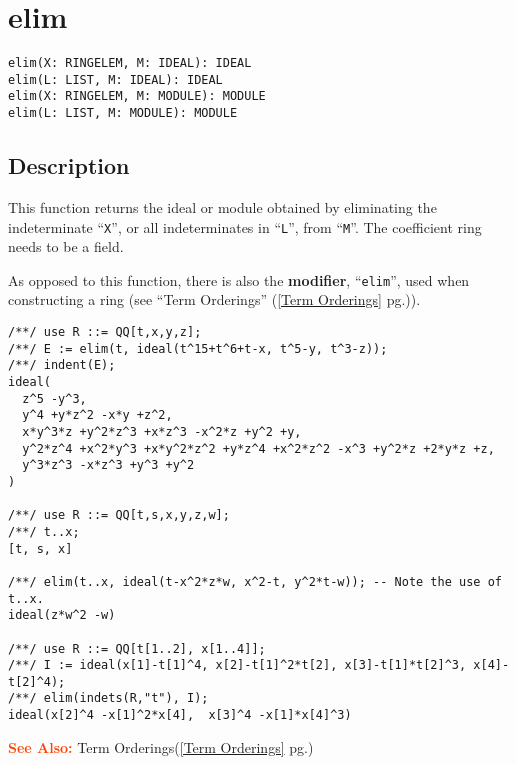 \documentclass[a4paper]{mybook}
\newenvironment{command}{}{} %
\newcommand\SeeAlso{\par\textcolor{OrangeRed}{\textbf{\large See Also: }}}
\begin{document}
\section{elim}
\label{elim}
\begin{command} %


\begin{Verbatim}[label=syntax, rulecolor=\color{MidnightBlue},
frame=single]
elim(X: RINGELEM, M: IDEAL): IDEAL
elim(L: LIST, M: IDEAL): IDEAL
elim(X: RINGELEM, M: MODULE): MODULE
elim(L: LIST, M: MODULE): MODULE
\end{Verbatim}


\subsection*{Description}

This function returns the ideal or module obtained by eliminating the
indeterminate ``\verb&X&'', or all indeterminates in ``\verb&L&'', from ``\verb&M&''.  The coefficient
ring needs to be a field.
\par 
As opposed to this function, there is also the \textbf{modifier}, ``\verb&elim&'',
used when constructing a ring (see ``Term Orderings'' (\ref{Term Orderings} pg.\pageref{Term Orderings})).
\begin{Verbatim}[label=example, rulecolor=\color{PineGreen}, frame=single]
/**/ use R ::= QQ[t,x,y,z];
/**/ E := elim(t, ideal(t^15+t^6+t-x, t^5-y, t^3-z));
/**/ indent(E);
ideal(
  z^5 -y^3,
  y^4 +y*z^2 -x*y +z^2,
  x*y^3*z +y^2*z^3 +x*z^3 -x^2*z +y^2 +y,
  y^2*z^4 +x^2*y^3 +x*y^2*z^2 +y*z^4 +x^2*z^2 -x^3 +y^2*z +2*y*z +z,
  y^3*z^3 -x*z^3 +y^3 +y^2
)

/**/ use R ::= QQ[t,s,x,y,z,w];
/**/ t..x;
[t, s, x]

/**/ elim(t..x, ideal(t-x^2*z*w, x^2-t, y^2*t-w)); -- Note the use of t..x.
ideal(z*w^2 -w)

/**/ use R ::= QQ[t[1..2], x[1..4]];
/**/ I := ideal(x[1]-t[1]^4, x[2]-t[1]^2*t[2], x[3]-t[1]*t[2]^3, x[4]-t[2]^4);
/**/ elim(indets(R,"t"), I);
ideal(x[2]^4 -x[1]^2*x[4],  x[3]^4 -x[1]*x[4]^3)
\end{Verbatim}


\SeeAlso %
  Term Orderings(\ref{Term Orderings} pg.\pageref{Term Orderings})
\end{command} %
\end{document}
